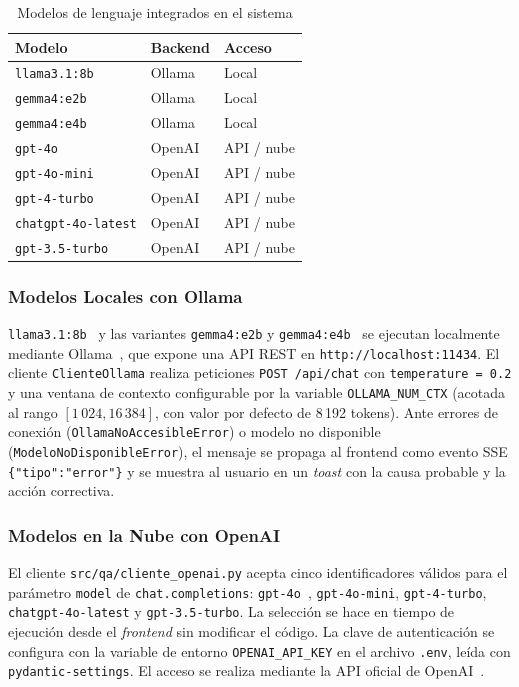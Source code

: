 \documentclass[conference]{IEEEtran}
\newcommand{\code}[1]{\texttt{\small #1}}
\begin{document}
\begin{table}[ht]
\centering
\caption{Modelos de lenguaje integrados en el sistema}
\label{tab:modelos}
\setlength{\tabcolsep}{4pt}
\begin{tabular}{@{}lll@{}}
\toprule
\textbf{Modelo} & \textbf{Backend} & \textbf{Acceso} \\
\midrule
\code{llama3.1:8b}        & Ollama & Local       \\
\code{gemma4:e2b}         & Ollama & Local       \\
\code{gemma4:e4b}         & Ollama & Local       \\
\code{gpt-4o}             & OpenAI & API / nube  \\
\code{gpt-4o-mini}        & OpenAI & API / nube  \\
\code{gpt-4-turbo}        & OpenAI & API / nube  \\
\code{chatgpt-4o-latest}  & OpenAI & API / nube  \\
\code{gpt-3.5-turbo}      & OpenAI & API / nube  \\
\bottomrule
\end{tabular}
\end{table}

\subsubsection{Modelos Locales con Ollama}

\code{llama3.1:8b}~\cite{touvron2023llama} y las variantes
\code{gemma4:e2b} y \code{gemma4:e4b}~\cite{team2024gemma} se ejecutan
localmente mediante Ollama~\cite{ollama}, que expone una API REST en
\code{http://localhost:11434}. El cliente \code{ClienteOllama} realiza
peticiones \code{POST /api/chat} con \code{temperature = 0.2} y una
ventana de contexto configurable por la variable \code{OLLAMA\_NUM\_CTX}
(acotada al rango $[1\,024, 16\,384]$, con valor por defecto de 8\,192
tokens). Ante errores de conexión (\code{OllamaNoAccesibleError}) o modelo
no disponible (\code{ModeloNoDisponibleError}), el mensaje se propaga al
frontend como evento SSE \code{\{"tipo":"error"\}} y se muestra al
usuario en un \textit{toast} con la causa probable y la acción correctiva.

\subsubsection{Modelos en la Nube con OpenAI}

El cliente \code{src/qa/cliente\_openai.py} acepta cinco identificadores
válidos para el parámetro \code{model} de \code{chat.completions}:
\code{gpt-4o}~\cite{openai2024gpt4o}, \code{gpt-4o-mini},
\code{gpt-4-turbo}, \code{chatgpt-4o-latest} y \code{gpt-3.5-turbo}. La
selección se hace en tiempo de ejecución desde el \textit{frontend} sin
modificar el código. La clave de autenticación se configura con la variable
de entorno \code{OPENAI\_API\_KEY} en el archivo \code{.env}, leída con
\code{pydantic-settings}. El acceso se realiza mediante la API oficial de
OpenAI~\cite{openai2024api}.
\end{document}
